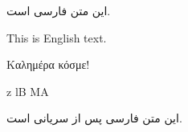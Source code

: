 \documentclass{article}
\begin{document}
    
    این متن فارسی است.
    
    This is English text.
    
    \foreignlanguage{greek}{Καλημέρα κόσμε!}
    
    {\serto\beginR {}z lB MA \endR}
    
    این متن فارسی پس از سریانی است.
    
\end{document}
